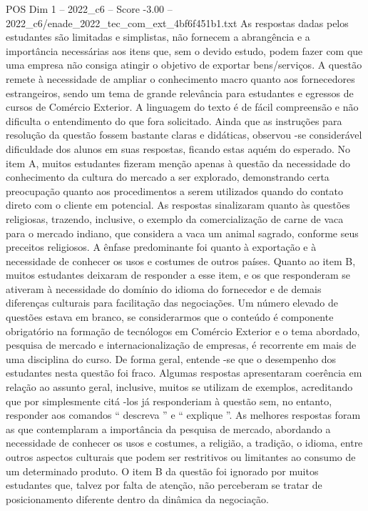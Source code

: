 \begin{textsample}{POS Dim 1 – 2022\_c6 – Score -3.00 – 2022\_c6/enade\_2022\_tec\_com\_ext\_4bf6f451b1.txt}
As respostas dadas pelos estudantes são limitadas e simplistas, não fornecem a abrangência e a importância necessárias aos itens que, sem o devido estudo, podem fazer com que uma empresa não consiga atingir o objetivo de exportar bens/serviços.
A questão remete à necessidade de ampliar o conhecimento macro quanto aos fornecedores estrangeiros, sendo um tema de grande relevância para estudantes e egressos de cursos de Comércio Exterior.
A linguagem do texto é de fácil compreensão e não dificulta o entendimento do que fora solicitado.
Ainda que as instruções para resolução da questão fossem bastante claras e didáticas, observou -se considerável dificuldade dos alunos em suas respostas, ficando estas aquém do esperado.
No item A, muitos estudantes fizeram menção apenas à questão da necessidade do conhecimento da cultura do mercado a ser explorado, demonstrando certa preocupação quanto aos procedimentos a serem utilizados quando do contato direto com o cliente em potencial.
As respostas sinalizaram quanto às questões religiosas, trazendo, inclusive, o exemplo da comercialização de carne de vaca para o mercado indiano, que considera a vaca um animal sagrado, conforme seus preceitos religiosos.
A ênfase predominante foi quanto à exportação e à necessidade de conhecer os usos e costumes de outros países.
Quanto ao item B, muitos estudantes deixaram de responder a esse item, e os que responderam se ativeram à necessidade do domínio do idioma do fornecedor e de demais diferenças culturais para facilitação das negociações.
Um número elevado de questões estava em branco, se considerarmos que o conteúdo é componente obrigatório na formação de tecnólogos em Comércio Exterior e o tema abordado, pesquisa de mercado e internacionalização de empresas, é recorrente em mais de uma disciplina do curso.
De forma geral, entende -se que o desempenho dos estudantes nesta questão foi fraco.
Algumas respostas apresentaram coerência em relação ao assunto geral, inclusive, muitos se utilizam de exemplos, acreditando que por simplesmente citá -los já responderiam à questão sem, no entanto, responder aos comandos “ descreva ” e “ explique ”.
As melhores respostas foram as que contemplaram a importância da pesquisa de mercado, abordando a necessidade de conhecer os usos e costumes, a religião, a tradição, o idioma, entre outros aspectos culturais que podem ser restritivos ou limitantes ao consumo de um determinado produto.
O item B da questão foi ignorado por muitos estudantes que, talvez por falta de atenção, não perceberam se tratar de posicionamento diferente dentro da dinâmica da negociação.

\end{textsample}
